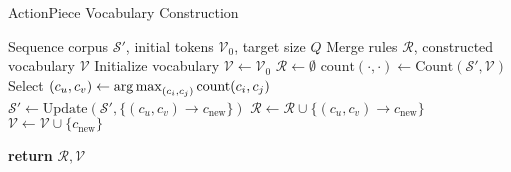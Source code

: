 \begin{algorithm}[!t]
\small
   \caption{ActionPiece Vocabulary Construction}
   \label{alg:vocab_construction_overall}
\begin{algorithmic}[1]
   \INPUT Sequence corpus $\mathcal{S}'$, initial tokens $\mathcal{V}_0$, target size $Q$
   \OUTPUT Merge rules $\mathcal{R}$, constructed vocabulary $\mathcal{V}$
   \STATE Initialize vocabulary $\mathcal{V} \gets \mathcal{V}_0$ 
   \STATE $\mathcal{R} \gets \emptyset$
    \STATE {}
    \STATE $\text{count}(\cdot, \cdot) \gets \text{Count}(\mathcal{S'}, \mathcal{V})$ 
      \STATE {}
      \STATE Select $(c_u, c_v) \gets \operatorname*{arg\,max}_{(c_i,c_j)} \text{count}(c_i,c_j)$
      \STATE $\mathcal{S}' \gets \text{Update}(\mathcal{S}', \{(c_u, c_v) \to c_{\text{new}}\})$ 
      \STATE $\mathcal{R} \gets \mathcal{R} \cup \{(c_u, c_v) \to c_{\text{new}}\}$ 
      \STATE $\mathcal{V} \gets \mathcal{V} \cup \{c_{\text{new}}\}$ 
   \ENDWHILE
   \item[\textbf{return} $\mathcal{R}, \mathcal{V}$]
\end{algorithmic}
\end{algorithm}

